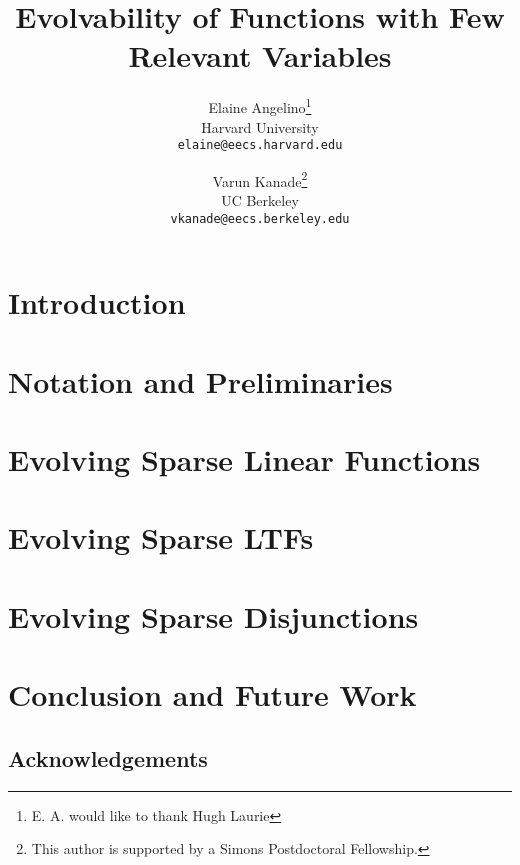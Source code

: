 \documentclass[11pt]{article}
\begin{document}
\title{Evolvability of Functions with Few Relevant Variables}
\author{Elaine Angelino\thanks{E. A. would like to thank Hugh Laurie} \\
Harvard University \\ \texttt{elaine@eecs.harvard.edu} \and Varun
Kanade\thanks{This author is supported by a Simons Postdoctoral Fellowship.} \\
UC Berkeley \\ \texttt{vkanade@eecs.berkeley.edu}}

\maketitle

\begin{abstract}

\end{abstract}

\section{Introduction}


\section{Notation and Preliminaries}


\section{Evolving Sparse Linear Functions}


\section{Evolving Sparse LTFs}


\section{Evolving Sparse Disjunctions}


\section{Conclusion and Future Work}


\subsection*{Acknowledgements} 


\nocite{*}

\end{document}
